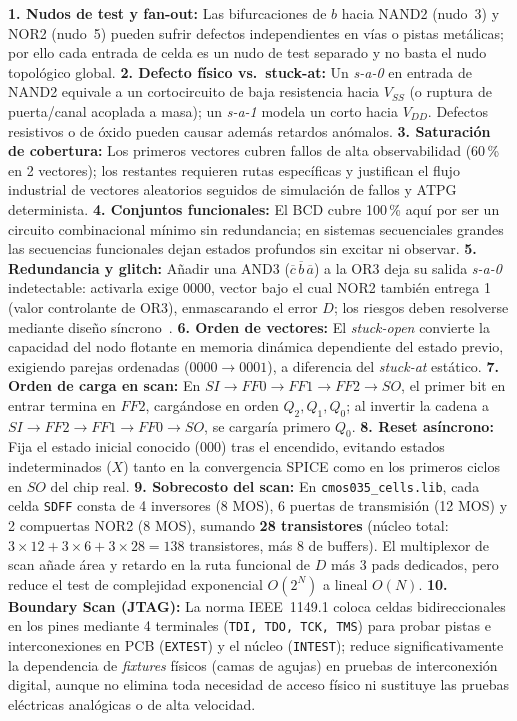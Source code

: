 \documentclass[10pt,twocolumn]{article}
\begin{document}
\textbf{1. Nudos de test y fan-out:} Las bifurcaciones de $b$ hacia NAND2 (nudo~3) y NOR2 (nudo~5) pueden sufrir defectos independientes en vías o pistas metálicas; por ello cada entrada de celda es un nudo de test separado y no basta el nudo topológico global. \textbf{2. Defecto físico vs.\ stuck-at:} Un \emph{s-a-0} en entrada de NAND2 equivale a un cortocircuito de baja resistencia hacia $V_{SS}$ (o ruptura de puerta/canal acoplada a masa); un \emph{s-a-1} modela un corto hacia $V_{DD}$. Defectos resistivos o de óxido pueden causar además retardos anómalos. \textbf{3. Saturación de cobertura:} Los primeros vectores cubren fallos de alta observabilidad (60\,\% en 2 vectores); los restantes requieren rutas específicas y justifican el flujo industrial de vectores aleatorios seguidos de simulación de fallos y ATPG determinista. \textbf{4. Conjuntos funcionales:} El BCD cubre 100\,\% aquí por ser un circuito combinacional mínimo sin redundancia; en sistemas secuenciales grandes las secuencias funcionales dejan estados profundos sin excitar ni observar. \textbf{5. Redundancia y glitch:} Añadir una AND3 ($\overline{c}\,\overline{b}\,\overline{a}$) a la OR3 deja su salida \emph{s-a-0} indetectable: activarla exige $0000$, vector bajo el cual NOR2 también entrega 1 (valor controlante de OR3), enmascarando el error $D$; los riesgos deben resolverse mediante diseño síncrono~\cite{pollan}. \textbf{6. Orden de vectores:} El \emph{stuck-open} convierte la capacidad del nodo flotante en memoria dinámica dependiente del estado previo, exigiendo parejas ordenadas ($0000\to 0001$), a diferencia del \emph{stuck-at} estático. \textbf{7. Orden de carga en scan:} En $SI\to FF0\to FF1\to FF2\to SO$, el primer bit en entrar termina en $FF2$, cargándose en orden $Q_2, Q_1, Q_0$; al invertir la cadena a $SI\to FF2\to FF1\to FF0\to SO$, se cargaría primero $Q_0$. \textbf{8. Reset asíncrono:} Fija el estado inicial conocido ($000$) tras el encendido, evitando estados indeterminados ($X$) tanto en la convergencia SPICE como en los primeros ciclos en $SO$ del chip real. \textbf{9. Sobrecosto del scan:} En \texttt{cmos035\_cells.lib}, cada celda \texttt{SDFF} consta de 4 inversores (8 MOS), 6 puertas de transmisión (12 MOS) y 2 compuertas NOR2 (8 MOS), sumando \textbf{28 transistores} (núcleo total: $3\times 12 + 3\times 6 + 3\times 28 = 138$ transistores, más 8 de buffers). El multiplexor de scan añade área y retardo en la ruta funcional de $D$ más 3 pads dedicados, pero reduce el test de complejidad exponencial $O(2^N)$ a lineal $O(N)$. \textbf{10. Boundary Scan (JTAG):} La norma IEEE~1149.1 coloca celdas bidireccionales en los pines mediante 4 terminales (\texttt{TDI, TDO, TCK, TMS}) para probar pistas e interconexiones en PCB (\texttt{EXTEST}) y el núcleo (\texttt{INTEST}); reduce significativamente la dependencia de \emph{fixtures} físicos (camas de agujas) en pruebas de interconexión digital, aunque no elimina toda necesidad de acceso físico ni sustituye las pruebas eléctricas analógicas o de alta velocidad.
\end{document}
